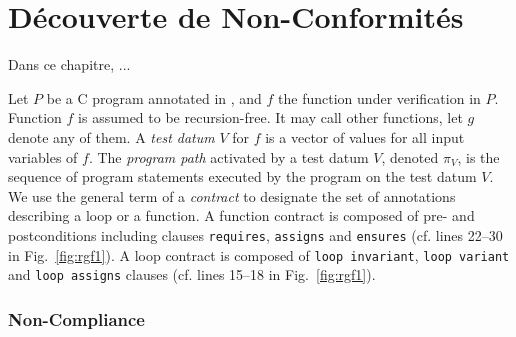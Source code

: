 
\chapter{Découverte de Non-Conformités}
\label{sec:ncd}

\chapterintro

Dans ce chapitre, ...


Let $P$ be a C program annotated in \eacsl, 
and $f$ the function under verification in $P$.
Function $f$ is assumed to be recursion-free.
It may call other functions, let $g$ denote any of them.
A \emph{test datum} $V$ for $f$ is a vector of values for all input variables of $f$.
The \emph{program path} activated by a test datum $V$, denoted $\pi_V$,  is the sequence of program statements
executed by the program on the test datum $V$.
We use the general term of a \emph{contract} 
to designate the set of \eacsl annotations describing a loop or a function.
A function contract is composed of pre- and postconditions including \eacsl clauses
\lstinline{requires}, \lstinline{assigns} and
\lstinline{ensures}  (cf. lines 22--30 in Fig.~\ref{fig:rgf1}).
A loop contract is composed of \lstinline{loop invariant},
\lstinline{loop variant} and \lstinline{loop assigns} clauses
(cf. lines 15--18 in Fig.~\ref{fig:rgf1}).

\subsection{Non-Compliance}
\label{subsec:NC}


